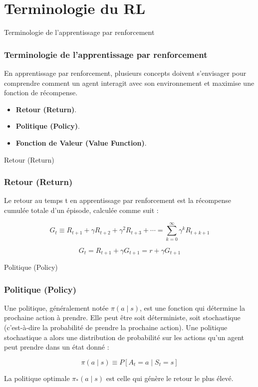 \documentclass[serif, aspectratio=169]{beamer}
\begin{document}
\section{Terminologie du RL}

\begin{frame}{Terminologie de l'apprentissage par renforcement}
	\frametitle{Terminologie de l'apprentissage par renforcement}
	
	En apprentissage par renforcement, plusieurs concepts doivent s'envisager pour comprendre comment un agent interagit avec son environnement et maximise une fonction de récompense.
	
	\vspace{10pt}
	
	\begin{itemize}
		\item \textbf{Retour (Return)}.
		
		\item \textbf{Politique (Policy)}.
		
		\item \textbf{Fonction de Valeur (Value Function)}.
	\end{itemize}
	
\end{frame}


\begin{frame}{Retour (Return)}
	\frametitle{Retour (Return)}
	
	Le retour au temps t en apprentissage par renforcement est la récompense cumulée totale d'un épisode, calculée comme suit :
	
	\[
	G_t \equiv R_{t+1} + \gamma R_{t+2} + \gamma^2 R_{t+3} + \cdots = \sum_{k=0}^{\infty} \gamma^k R_{t+k+1}
	\]
	
	\vspace{10pt}
	
	\[
	G_t = R_{t+1} + \gamma G_{t+1} = r + \gamma G_{t+1}
	\]
	
\end{frame}

\begin{frame}{Politique (Policy)}
	\frametitle{Politique (Policy)}
	
	Une politique, généralement notée \( \pi(a \mid s) \), est une fonction qui détermine la prochaine action à prendre. Elle peut être soit déterministe, soit stochastique (c'est-à-dire la probabilité de prendre la prochaine action). Une politique stochastique a alors une distribution de probabilité sur les actions qu'un agent peut prendre dans un état donné :
	
	\[
	\pi(a \mid s) \equiv P[A_t = a \mid S_t = s]
	\]
	
	\vspace{10pt}
	
	La politique optimale \( \pi_*(a \mid s) \) est celle qui génère le retour le plus élevé.
	
\end{frame}
\end{document}
